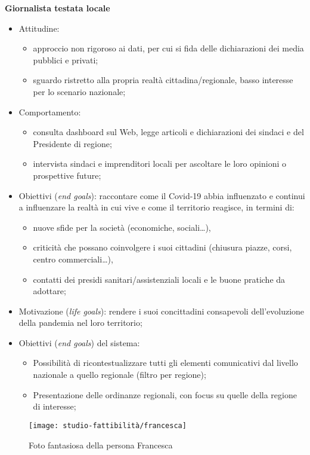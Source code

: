 \textbf{Giornalista testata locale}
\begin{itemize}
    \item Attitudine:
    \begin{itemize}
        \item approccio non rigoroso ai dati, per cui si fida delle dichiarazioni dei media pubblici e privati;
        \item sguardo ristretto alla propria realtà cittadina/regionale, basso interesse per lo scenario nazionale;
    \end{itemize}
	\item Comportamento: 
	\begin{itemize}
	    \item consulta dashboard sul Web, legge articoli e dichiarazioni dei sindaci e del Presidente di regione;
	    \item intervista sindaci e imprenditori locali per ascoltare le loro opinioni o prospettive future;
    \end{itemize}
	\item Obiettivi (\textit{end goals}): raccontare come il Covid-19 abbia influenzato e continui a influenzare la realtà in cui vive e come il territorio reagisce, in termini di:
	\begin{itemize}
        \item nuove sfide per la società (economiche, sociali…),
        \item criticità che possano coinvolgere i suoi cittadini (chiusura piazze, corsi, centro commerciali…),
        \item contatti dei presidi sanitari/assistenziali locali e le buone pratiche da adottare;
    \end{itemize}
	\item Motivazione (\textit{life goals}): rendere i suoi concittadini consapevoli dell'evoluzione della pandemia nel loro territorio;
	\item Obiettivi (\textit{end goals}) del sistema:
    \begin{itemize}
        \item Possibilità di ricontestualizzare tutti gli elementi comunicativi dal livello nazionale a quello regionale (filtro per regione);
        \item Presentazione delle ordinanze regionali, con focus su quelle della regione di interesse;
    \end{itemize}
\end{itemize}

\begin{wrapfigure}{l}{7cm}
    \texttt{[image: studio-fattibilità/francesca]}
    \caption{Foto fantasiosa della persona Francesca}
\end{wrapfigure}
        
